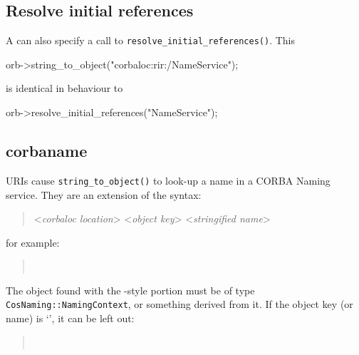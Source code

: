 \documentclass[11pt,oneside,a4paper]{book}
\newcommand{\intf}[1]{\texttt{#1}}
\newcommand{\op}[1]{\texttt{#1()}}
\newcommand{\dsc}{\discretionary{}{}{}}
\begin{document}
\subsection{Resolve initial references}

A  can also specify a call to
\op{resolve\_initial\_references}. This

\begin{cxxlisting}
orb->string_to_object("corbaloc:rir:/NameService");
\end{cxxlisting}

\noindent is identical in behaviour to

\begin{cxxlisting}
orb->resolve_initial_references("NameService");
\end{cxxlisting}






\subsection{corbaname}
\label{sec:corbaname}

 URIs cause \op{string\_to\_object} to look-up a
name in a CORBA Naming service. They are an extension of the
 syntax:

\begin{quote}
%
<\textit{corbaloc location}>%
\corbauri{/}%
<\textit{object key}>%
\corbauri{#}%
<\textit{stringified name}>
\end{quote}

\noindent for example:

\begin{quote}
\\
\end{quote}

\noindent The object found with the -style portion
must be of type \intf{CosNaming::\dsc{}NamingContext}, or something
derived from it. If the object key (or  name) is
`', it can be left out:

\begin{quote}
\\
\end{quote}
\end{document}
